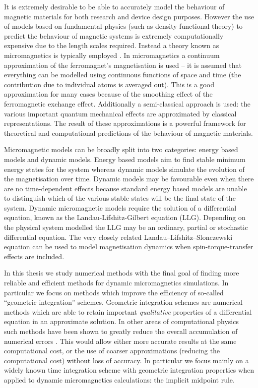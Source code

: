 It is extremely desirable to be able to accurately model the behaviour of magnetic materials for both research and device design purposes.
However the use of models based on fundamental physics (such as density functional theory) to predict the behaviour of magnetic systems is extremely computationally expensive due to the length scales required.
Instead a theory known as micromagnetics is typically employed \cite{Aharoni1996}.
In micromagnetics a continuum approximation of the ferromagnet's magnetisation is used -- it is  assumed that everything can be modelled using continuous functions of space and time (\ie the contribution due to individual atoms is averaged out).
This is a good approximation for many cases because of the smoothing effect of the ferromagnetic exchange effect.
Additionally a semi-classical approach is used: the various important quantum mechanical effects are approximated by classical representations.
The result of these approximations is a powerful framework for theoretical and computational predictions of the behaviour of magnetic materials.

Micromagnetic models can be broadly split into two categories: energy based models and dynamic models.
Energy based models aim to find stable minimum energy states for the system whereas
dynamic models simulate the evolution of the magnetisation over time.
Dynamic models may be favourable even when there are no time-dependent effects because standard energy based models are unable to distinguish which of the various stable states will be the final state of the system.
Dynamic micromagnetic models require the solution of a differential equation, known as the Landau-Lifshitz-Gilbert equation (LLG).
Depending on the physical system modelled the LLG may be an ordinary, partial or stochastic differential equation.
The very closely related Landau–Lifshitz–Slonczewski equation can be used to model magnetisation dynamics when spin-torque-transfer effects are included.


In this thesis we study numerical methods with the final goal of finding more reliable and efficient methods for dynamic micromagnetics simulations.
In particular we focus on methods which improve the efficiency of so-called ``geometric integration'' schemes.
Geometric integration schemes are numerical methods which are able to retain important \emph{qualitative} properties of a differential equation in an approximate solution.
In other areas of computational physics such methods have been shown to greatly reduce the overall accumulation of numerical errors \cite[77]{Iserles2009}.
This would allow either more accurate results at the same computational cost, or the use of coarser approximations (reducing the computational cost) without loss of accuracy.
In particular we focus mainly on a widely known time integration scheme with geometric integration properties when applied to dynamic micromagnetics calculations: the implicit midpoint rule.



